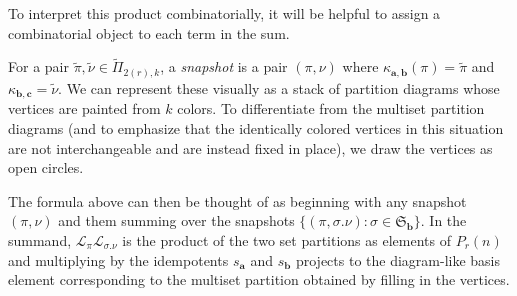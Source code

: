 \documentclass[ALCO,Unicode,published]{cedram}
\newcommand{\LL}{\mathcal{L}}
\newcommand{\SG}{\mathfrak{S}}
\newcommand{\bfa}{{\boldsymbol{a}}}
\newcommand{\bfb}{{\boldsymbol{b}}}
\newcommand{\bfc}{{\boldsymbol{c}}}
\newcommand{\tpi}{{\tilde{\pi}}}
\newcommand{\tnu}{{\tilde{\nu}}}
\newcommand{\defn}[1]{\textcolor{defncolor}{\emph{#1}}}
\begin{document}
To interpret this product combinatorially, it will be helpful to assign a combinatorial object to each term in the sum.

\begin{defi}\label{def:snapshot}
    For a pair $\tpi,\tnu\in\tilde\Pi_{2(r),k}$, a \defn{snapshot} is a pair $(\pi,\nu)$ where $\kappa_{\bfa,\bfb}(\pi)=\tpi$ and $\kappa_{\bfb,\bfc}=\tnu$. We can represent these visually as a stack of partition diagrams whose vertices are painted from $k$ colors. To differentiate from the multiset partition diagrams (and to emphasize that the identically colored vertices in this situation are not interchangeable and are instead fixed in place), we draw the vertices as open circles.
\end{defi}

  The formula above can then be thought of as beginning with any snapshot $(\pi,\nu)$ and them summing over the snapshots $\{(\pi,\sigma.\nu):\sigma\in\SG_\bfb\}$. In the summand, $\LL_\pi\LL_{\sigma.\nu}$ is the product of the two set partitions as elements of $P_r(n)$ and multiplying by the idempotents $s_\bfa$ and $s_\bfb$ projects to the diagram-like basis element corresponding to the multiset partition obtained by filling in the vertices.
\end{document}
